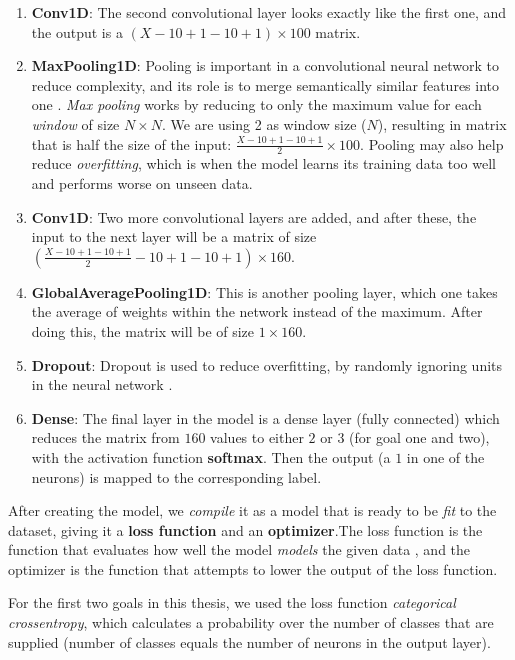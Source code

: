 \begin{enumerate}
      \item \textbf{Conv1D}: The second convolutional layer looks exactly like the first one, and the output is a $(X-10+1-10+1) \times 100$ matrix. 
      \item \textbf{MaxPooling1D}: Pooling is important in a convolutional neural network to reduce complexity, and its role is to merge semantically similar features into one \cite{deep_learning}. 
            \textit{Max pooling} works by reducing to only the maximum value for each \textit{window} of size $N \times N$. We are using 2 as 
            window size ($N$), resulting in matrix that is half the size of the input: $ \frac{X-10+1-10+1}{2} \times 100$. 
            Pooling may also help reduce \textit{overfitting}, which is when the model learns its training data too well and performs worse on unseen data.
      \item \textbf{Conv1D}: Two more convolutional layers are added, and after these, the input to the next layer will be a matrix of size
            $ \left( \frac{X-10+1-10+1}{2}-10+1-10+1 \right) \times 160 $.
      \item \textbf{GlobalAveragePooling1D}: This is another pooling layer, which one takes the average of weights within the network instead of the maximum.
            After doing this, the matrix will be of size $ 1 \times 160 $.
      \item \textbf{Dropout}: Dropout is used to reduce overfitting, by randomly ignoring units in the neural network \cite{dropout}. 
      \item \textbf{Dense}: The final layer in the model is a dense layer (fully connected) which reduces the matrix from $160$ values to 
            either $2$ or $3$ (for goal one and two), with the activation function \textbf{softmax}. 
            Then the output (a $1$ in one of the neurons) is mapped to the corresponding label.
\end{enumerate}

After creating the model, we \textit{compile} it as a model that is ready to be \textit{fit} to the dataset, 
giving it a \textbf{loss function} and an \textbf{optimizer}.The loss function is the function that evaluates how well the 
model \textit{models} the given data \cite{loss_functions}, and the optimizer is the function that attempts to lower the output of the loss function. 

For the first two goals in this thesis, we used the loss function \textit{categorical crossentropy}, which calculates a probability over the 
number of classes that are supplied (number of classes equals the number of neurons in the output layer). 

